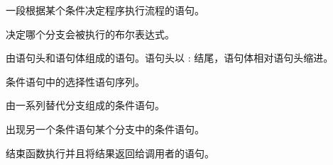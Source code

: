 {{{{\begin{description}
{\item[条件语句:] 一段根据某个条件决定程序执行流程的语句。
  


\item[条件:] 决定哪个分支会被执行的布尔表达式。


\item[复合语句:] 由语句头和语句体组成的语句。语句头以 : 结尾，语句体相对语句头缩进。


\item[分支:] 条件语句中的选择性语句序列。


\item[链式条件:] 由一系列替代分支组成的条件语句。
  


\item[嵌套条件:] 出现另一个条件语句某个分支中的条件语句。
  


\item[返回语句：] 结束函数执行并且将结果返回给调用者的语句。


}
\end{description}}}}}

